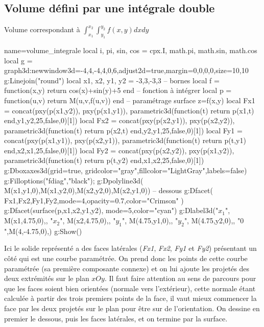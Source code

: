 \subsection{Volume défini par une intégrale double}
\begin{demo}{Volume correspondant à $\int_{x_1}^{x_2}\int_{y_1}^{y_2}f(x,y)dxdy$}
\begin{luadraw}{name=volume_integrale}
local i, pi, sin, cos = cpx.I, math.pi, math.sin, math.cos
local g = graph3d:new{window3d={-4,4,-4,4,0,6},adjust2d=true,margin={0,0,0,0},size={10,10}}
g:Linejoin("round")
local x1, x2, y1, y2 = -3,3,-3,3 -- bornes
local f = function(x,y) return cos(x)+sin(y)+5 end -- fonction à intégrer
local p = function(u,v) return M(u,v,f(u,v)) end -- paramétrage surface z=f(x,y)
local Fx1 = concat({pxy(p(x1,y2)), pxy(p(x1,y1))}, parametric3d(function(t) return p(x1,t) end,y1,y2,25,false,0)[1])
local Fx2 = concat({pxy(p(x2,y1)), pxy(p(x2,y2))}, parametric3d(function(t) return p(x2,t) end,y2,y1,25,false,0)[1])
local Fy1 = concat({pxy(p(x1,y1)), pxy(p(x2,y1))}, parametric3d(function(t) return p(t,y1) end,x2,x1,25,false,0)[1])
local Fy2 = concat({pxy(p(x2,y2)), pxy(p(x1,y2))}, parametric3d(function(t) return p(t,y2) end,x1,x2,25,false,0)[1])
g:Dboxaxes3d({grid=true, gridcolor="gray",fillcolor="LightGray",labels=false})
g:Filloptions("fdiag","black"); g:Dpolyline3d( {M(x1,y1,0),M(x1,y2,0),M(x2,y2,0),M(x2,y1,0)}) -- dessous
g:Dfacet( {Fx1,Fx2,Fy1,Fy2},{mode=4,opacity=0.7,color="Crimson"} )
g:Dfacet(surface(p,x1,x2,y1,y2), {mode=5,color="cyan"})
g:Dlabel3d("$x_1$", M(x1,4.75,0),{}, "$x_2$", M(x2,4.75,0),{}, "$y_1$", M(4.75,y1,0),{}, "$y_2$", M(4.75,y2,0),{}, "$0$",M(4,-4.75,0),{})  
g:Show()  
\end{luadraw}
\end{demo}

Ici le solide représenté a des faces latérales (\emph{Fx1}, \emph{Fx2}, \emph{Fy1} et \emph{Fy2}) présentant un côté qui est une courbe paramétrée. On prend donc les points de cette courbe paramétrée (sa première composante connexe) et on lui ajoute les projetés des deux extrémités sur le plan $xOy$. Il faut faire attention au sens de parcours pour que les faces soient bien orientées (normale vers l'extérieur), cette normale étant calculée à partir des trois premiers points de la face, il vaut mieux commencer la face par les deux projetés sur le plan pour être sur de l'orientation.
On dessine en premier le dessous, puis les faces latérales, et on termine par la surface.


